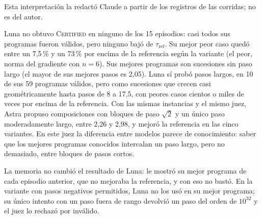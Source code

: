 Esta interpretación la redactó Claude a partir de los registros de las corridas; no es del autor.

Luna no obtuvo \textsc{Certified} en ninguno de los 15 episodios: casi todos sus programas fueron válidos, pero ninguno bajó de $\tau_{\mathrm{ref}}$. Su mejor peor caso quedó entre un 7{,}5\,\% y un 73\,\% por encima de la referencia según la variante (el peor, norma del gradiente con $n = 6$). Sus mejores programas son sucesiones sin paso largo (el mayor de sus mejores pasos es 2{,}05). Luna sí probó pasos largos, en 10 de sus 59 programas válidos, pero como sucesiones que crecen casi geométricamente hasta pasos de 8 a 17{,}5, con peores casos cientos o miles de veces por encima de la referencia. Con las mismas instancias y el mismo juez, Astra propuso composiciones con bloques de paso $\sqrt{2}$ y un único paso moderadamente largo, entre 2{,}26 y 2{,}98, y mejoró la referencia en las cinco variantes. En este juez la diferencia entre modelos parece de conocimiento: saber que los mejores programas conocidos intercalan un paso largo, pero no demasiado, entre bloques de pasos cortos.

La memoria no cambió el resultado de Luna: le mostró su mejor programa de cada episodio anterior, que no mejoraba la referencia, y con eso no bastó. En la variante con pasos negativos permitidos, Luna no los usó en su mejor programa; su único intento con un paso fuera de rango devolvió un paso del orden de $10^{32}$ y el juez lo rechazó por inválido.
